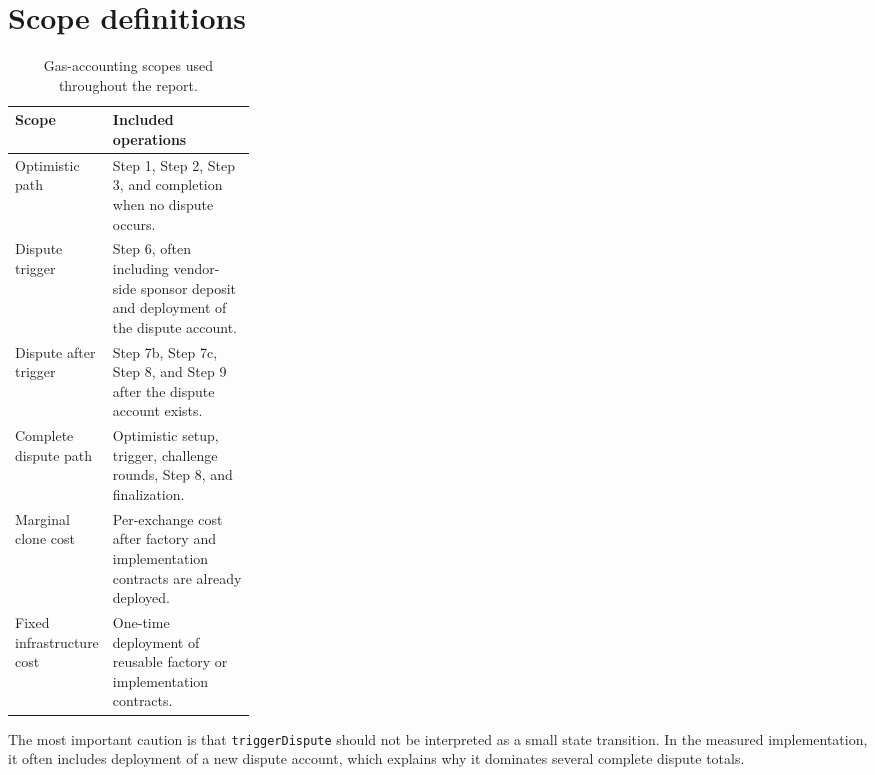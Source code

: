 \section{Scope definitions}

\begin{table}[htbp]
  \centering
  \begin{tabularx}{\linewidth}{>{\raggedright\arraybackslash}p{0.28\linewidth}>{\raggedright\arraybackslash}X}
    \toprule
    Scope & Included operations \\
    \midrule
    Optimistic path & Step 1, Step 2, Step 3, and completion when no dispute occurs. \\
    Dispute trigger & Step 6, often including vendor-side sponsor deposit and deployment
    of the dispute account. \\
    Dispute after trigger & Step 7b, Step 7c, Step 8, and Step 9 after the dispute account
    exists. \\
    Complete dispute path & Optimistic setup, trigger, challenge rounds, Step 8, and
    finalization. \\
    Marginal clone cost & Per-exchange cost after factory and implementation contracts
    are already deployed. \\
    Fixed infrastructure cost & One-time deployment of reusable factory or implementation
    contracts. \\
    \bottomrule
  \end{tabularx}
  \caption{Gas-accounting scopes used throughout the report.}
  \label{tab:app-scope-definitions}
\end{table}

The most important caution is that \texttt{triggerDispute} should not be interpreted as a
small state transition. In the measured implementation, it often includes deployment of a
new dispute account, which explains why it dominates several complete dispute totals.
